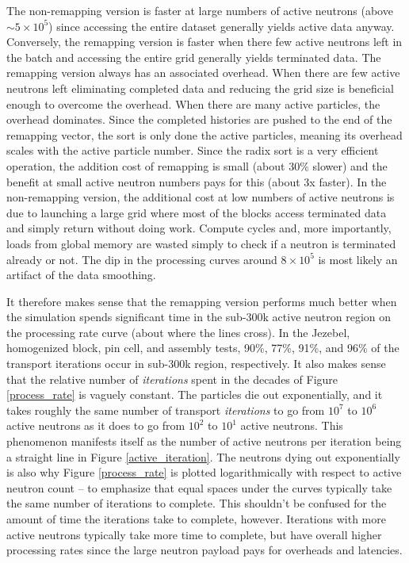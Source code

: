 The non-remapping version is faster at large numbers of active neutrons (above $\sim5 \times 10^{5}$) since accessing the entire dataset generally yields active data anyway.  Conversely, the remapping version is faster when there few active neutrons left in the batch and accessing the entire grid generally yields terminated data.  The remapping version always has an associated overhead. When there are few active neutrons left eliminating completed data and reducing the grid size is beneficial enough to overcome the overhead. When there are many active particles, the overhead dominates. Since the completed histories are pushed to the end of the remapping vector, the sort is only done the active particles, meaning its overhead scales with the active particle number.  Since the radix sort is a very efficient operation, the addition cost of remapping is small (about 30\% slower) and the benefit at small active neutron numbers pays for this (about 3x faster).   In the non-remapping version, the additional cost at low numbers of active neutrons is due to launching a large grid where most of the blocks access terminated data and simply return without doing work.  Compute cycles and, more importantly, loads from global memory are wasted simply to check if a neutron is terminated already or not.  The dip in the processing curves around $8\times10^5$  is most likely an artifact of the data smoothing.

It therefore makes sense that the remapping version performs much better when the simulation spends significant time in the sub-300k active neutron region on the processing rate curve (about where the lines cross).  In the Jezebel, homogenized block, pin cell, and assembly tests, 90\%, 77\%, 91\%, and 96\% of the transport iterations occur in sub-300k region, respectively.  It also makes sense that the relative number of \emph{iterations} spent in the decades of Figure \ref{process_rate} is vaguely constant.  The particles die out exponentially, and it takes roughly the same number of transport \emph{iterations} to go from $10^7$ to $10^6$ active neutrons as it does to go from $10^2$ to $10^1$ active neutrons.  This phenomenon manifests itself as the number of active neutrons per iteration being a straight line in Figure \ref{active_iteration}.  The neutrons dying out exponentially is also why Figure \ref{process_rate} is plotted logarithmically with respect to active neutron count -- to emphasize that equal spaces under the curves typically take the same number of iterations to complete.  This shouldn't be confused for the amount of time the iterations take to complete, however.  Iterations with more active neutrons typically take more time to complete, but have overall higher processing rates since the large neutron payload pays for overheads and latencies.

